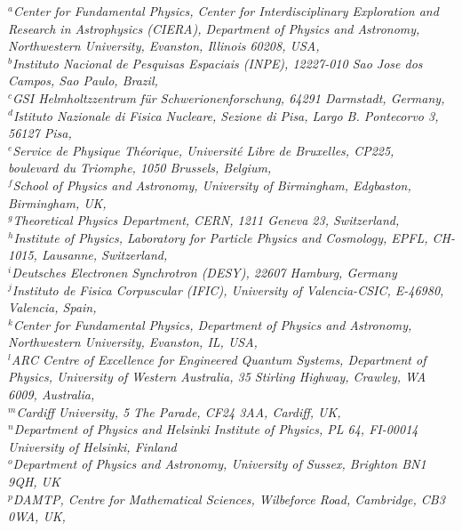 \documentclass[11pt,a4paper]{article}
\begin{document}
\begin{center}
\newpage
\vspace*{2cm}
{\small\it{
$^{a}${Center for Fundamental Physics, Center for Interdisciplinary Exploration and Research in Astrophysics (CIERA), Department of Physics and Astronomy, Northwestern University, Evanston, Illinois 60208, USA}, \\
$^{b}${Instituto Nacional de Pesquisas Espaciais (INPE), 12227-010 Sao Jose dos Campos, Sao Paulo, Brazil}, \\
$^c${GSI Helmholtzzentrum f\"ur Schwerionenforschung, 64291 Darmstadt, Germany}, \\
$^d${Istituto Nazionale di Fisica Nucleare, Sezione di Pisa, Largo B. Pontecorvo 3, 56127 Pisa}, \\
$^e${Service de Physique Th\'eorique, Universit\'e  Libre de Bruxelles, CP225, \\ boulevard du Triomphe, 1050 Brussels, Belgium}, \\
$^f${School of Physics and Astronomy, University of Birmingham, Edgbaston, Birmingham, UK}, \\
$^g${Theoretical Physics Department, CERN, 1211 Geneva 23, Switzerland}, \\%
$^h${Institute of Physics, Laboratory for Particle Physics and Cosmology, EPFL, CH-1015, Lausanne, Switzerland},\\
$^i${Deutsches Electronen Synchrotron (DESY), 22607 Hamburg, Germany} \\
$^j${Instituto de Fisica Corpuscular (IFIC), University of Valencia-CSIC, E-46980, Valencia, Spain}, \\
$^k${Center for Fundamental Physics, Department of Physics and Astronomy,
Northwestern University,
Evanston, IL, USA}, \\
$^l${ARC Centre of Excellence for Engineered Quantum Systems, Department of Physics, University of Western Australia, 35 Stirling Highway, Crawley, WA 6009, Australia}, \\
$^m${Cardiff University, 5 The Parade, CF24 3AA, Cardiff, UK}, \\
$^n${Department of Physics and Helsinki Institute of Physics, PL 64, FI-00014 University of Helsinki, Finland} \\
$^o${Department of Physics and Astronomy, University of Sussex, Brighton BN1 9QH, UK} \\
$^p${DAMTP, Centre for Mathematical Sciences, Wilbeforce Road, Cambridge, CB3 0WA, UK}, \\
}}
\end{center}
\end{document}
